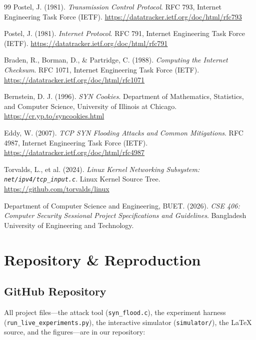 \documentclass[11pt,a4paper]{report}
\begin{document}
\cleardoublepage
{}
{}
\begin{thebibliography}{99}
    Postel, J. (1981). \emph{Transmission Control Protocol}. RFC 793, Internet Engineering Task Force (IETF). \url{https://datatracker.ietf.org/doc/html/rfc793}
    
    Postel, J. (1981). \emph{Internet Protocol}. RFC 791, Internet Engineering Task Force (IETF). \url{https://datatracker.ietf.org/doc/html/rfc791}
    
    Braden, R., Borman, D., \& Partridge, C. (1988). \emph{Computing the Internet Checksum}. RFC 1071, Internet Engineering Task Force (IETF). \url{https://datatracker.ietf.org/doc/html/rfc1071}
    
    Bernstein, D. J. (1996). \emph{SYN Cookies}. Department of Mathematics, Statistics, and Computer Science, University of Illinois at Chicago. \url{https://cr.yp.to/syncookies.html}
    
    Eddy, W. (2007). \emph{TCP SYN Flooding Attacks and Common Mitigations}. RFC 4987, Internet Engineering Task Force (IETF). \url{https://datatracker.ietf.org/doc/html/rfc4987}
    
    Torvalds, L., et al. (2024). \emph{Linux Kernel Networking Subsystem: \texttt{net/ipv4/tcp\_input.c}}. Linux Kernel Source Tree. \url{https://github.com/torvalds/linux}
    
    Department of Computer Science and Engineering, BUET. (2026). \emph{CSE 406: Computer Security Sessional Project Specifications and Guidelines}. Bangladesh University of Engineering and Technology.
\end{thebibliography}

\appendix
\chapter{Repository \& Reproduction}

\section{GitHub Repository}
All project files---the attack tool (\texttt{syn\_flood.c}), the experiment harness (\texttt{run\_\-live\_\-experiments.py}), the interactive simulator (\texttt{simulator/}), the LaTeX source, and the figures---are in our repository:
\end{document}
